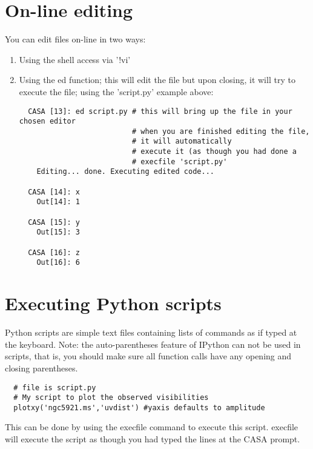 \section{On-line editing}
\label{section:python.edit}

You can edit files on-line in two ways:

\begin{enumerate}
   \item Using the shell access via '!vi'
   \item Using the ed function; this will edit the file but upon
   closing, it will try to execute the file; using the 'script.py'
   example above: 

\small
\begin{verbatim}
  CASA [13]: ed script.py # this will bring up the file in your chosen editor
                          # when you are finished editing the file, 
                          # it will automatically
                          # execute it (as though you had done a 
                          # execfile 'script.py'
    Editing... done. Executing edited code...

  CASA [14]: x
    Out[14]: 1

  CASA [15]: y
    Out[15]: 3

  CASA [16]: z
    Out[16]: 6
\end{verbatim}
\normalsize
\end{enumerate}

\section{Executing Python scripts}
\label{section:python.scripts}

Python scripts are simple text files containing lists of commands as
if typed at the keyboard. Note: the auto-parentheses feature of IPython
can not be used in scripts, that is, you should make sure all function
calls have any opening and closing parentheses. 

\small
\begin{verbatim}
  # file is script.py
  # My script to plot the observed visibilities
  plotxy('ngc5921.ms','uvdist') #yaxis defaults to amplitude
\end{verbatim}
\normalsize

This can be done by using the execfile command to execute this
script.  execfile will execute the script as though you had typed the
lines at the CASA prompt.  

